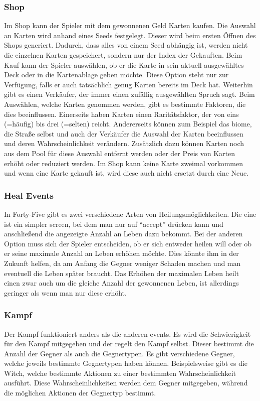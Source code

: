 \subsubsection{Shop}\label{subsubsec:shop}
Im Shop kann der Spieler mit dem gewonnenen Geld Karten kaufen.
Die Auswahl an Karten wird anhand eines Seeds festgelegt.
Dieser wird beim ersten Öffnen des Shops generiert.
Dadurch, dass alles von einem Seed abhängig ist, werden nicht die einzelnen Karten gespeichert, sondern nur der Index der Gekauften.
Beim Kauf kann der Spieler auswählen, ob er die Karte in sein aktuell ausgewähltes Deck oder in die Kartenablage geben möchte.
Diese Option steht nur zur Verfügung, falls er auch tatsächlich genug Karten bereits im Deck hat.
Weiterhin gibt es einen Verkäufer, der immer einen zufällig ausgewählten Spruch sagt.
Beim Auswählen, welche Karten genommen werden, gibt es bestimmte Faktoren, die dies beeinflussen.
Einerseits haben Karten einen Raritätsfaktor, der von eins (=häufig) bis drei (=selten) reicht.
Andererseits können zum Beispiel das biome, die Straße selbst und auch der Verkäufer die Auswahl der Karten beeinflussen und deren Wahrscheinlichkeit verändern.
Zusätzlich dazu können Karten noch aus dem Pool für diese Auswahl entfernt werden oder der Preis von Karten erhöht oder reduziert werden.
Im Shop kann keine Karte zweimal vorkommen und wenn eine Karte gekauft ist, wird diese auch nicht ersetzt durch eine Neue.

\subsubsection{Heal Events}\label{subsubsec:heal-event}
In Forty-Five gibt es zwei verschiedene Arten von Heilungsmöglichkeiten.
Die eine ist ein simpler screen, bei dem man nur auf ``accept'' drücken kann und anschließend die angezeigte Anzahl an Leben dazu bekommt.
Bei der anderen Option muss sich der Spieler entscheiden, ob er sich entweder heilen will oder ob er seine maximale Anzahl an Leben erhöhen möchte.
Dies könnte ihm in der Zukunft helfen, da am Anfang die Gegner weniger Schaden machen und man eventuell die Leben später braucht.
Das Erhöhen der maximalen Leben heilt einen zwar auch um die gleiche Anzahl der gewonnenen Leben, ist allerdings geringer als wenn man nur diese erhöht.

\subsubsection{Kampf}\label{subsubsec:kampf}
Der Kampf funktioniert anders als die anderen events.
Es wird die Schwierigkeit für den Kampf mitgegeben und der  regelt den Kampf selbst.
Dieser bestimmt die Anzahl der Gegner als auch die Gegnertypen.
Es gibt verschiedene Gegner, welche jeweils bestimmte Gegnertypen haben können.
Beispielsweise gibt es die Witch, welche bestimmte Aktionen zu einer bestimmten Wahrscheinlichkeit ausführt.
Diese Wahrscheinlichkeiten werden dem Gegner mitgegeben, während die möglichen Aktionen der Gegnertyp bestimmt.


